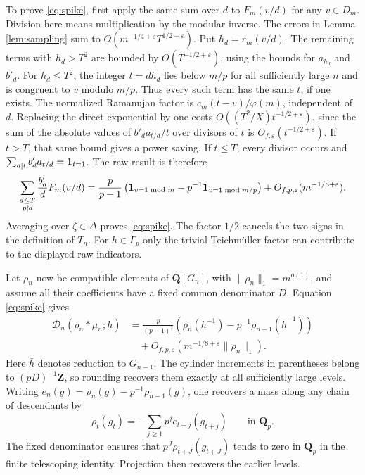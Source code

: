 \documentclass[11pt]{article}
\newcommand{\Z}{\mathbf Z}
\newcommand{\Q}{\mathbf Q}
\begin{document}
To prove \eqref{eq:spike}, first apply the same sum over \(d\) to
\(F_m(v/d)\) for any \(v\in D_m\). Division here means multiplication
by the modular inverse. The errors in Lemma \ref{lem:sampling} sum
to \(O(m^{-1/4+\varepsilon}T^{1/2+\varepsilon})\). Put
\(h_d=r_m(v/d)\). The remaining terms with \(h_d>T^2\) are bounded
by \(O(T^{-1/2+\varepsilon})\), using the bounds for \(a_{h_d}\)
and \(b'_d\). For \(h_d\le T^2\), the integer \(t=d h_d\) lies below
\(m/p\) for all sufficiently large \(n\) and is congruent to \(v\) modulo
\(m/p\). Thus every such term has the same \(t\), if one exists.
The normalized Ramanujan factor is \(c_m(t-v)/\varphi(m)\),
independent of \(d\). Replacing the direct exponential by one costs
\(O((T^2/X)t^{-1/2+\varepsilon})\), since the sum of the absolute
values of \(b'_d a_{t/d}/t\) over divisors of \(t\) is
\(O_{f,\varepsilon}(t^{-1/2+\varepsilon})\).
If \(t>T\), that same bound gives a power saving.
If \(t\le T\), every divisor occurs and
\(\sum_{d\mid t}b'_d a_{t/d}={\bf1}_{t=1}\).
The raw result is therefore
\[
 \sum_{\substack{d\le T\\p\nmid d}}\frac{b'_d}{d}F_m(v/d)
 =
 \frac{p}{p-1}\left(
    {\bf1}_{v=1\bmod m}-p^{-1}{\bf1}_{v=1\bmod m/p}\right)
   + O_{f,p,\varepsilon}(m^{-1/8+\varepsilon}).
\]
Averaging over \(\zeta\in\Delta\) proves \eqref{eq:spike}. The factor
\(1/2\) cancels the two signs in the definition of \(T_n\). For
\(h\in\Gamma_p\) only the trivial Teichm\"uller factor can contribute
to the displayed raw indicators.

Let \(\rho_n\) now be compatible elements of \(\Q[G_n]\), with
\(\|\rho_n\|_1=m^{o(1)}\), and assume all their coefficients have a
fixed common denominator \(D\). Equation \eqref{eq:spike} gives
\begin{align*}
 \mathcal D_n(\rho_n*\mu_n;h)
 &=\frac{p}{(p-1)^2}
     \left(\rho_n(h^{-1})-p^{-1}\rho_{n-1}(\bar h^{-1})\right)\\
 &\quad+O_{f,p,\varepsilon}\left(m^{-1/8+\varepsilon}
                                      \|\rho_n\|_1\right).
\end{align*}
Here \(\bar h\) denotes reduction to \(G_{n-1}\). The cylinder
increments in parentheses belong to \((pD)^{-1}\Z\), so rounding
recovers them exactly at all sufficiently large levels.
Writing \(e_n(g)=\rho_n(g)-p^{-1}\rho_{n-1}(\bar g)\), one recovers
a mass along any chain of descendants by
\[
 \rho_t(g_t)=-\sum_{j\ge1}p^j e_{t+j}(g_{t+j})
       \qquad\text{in }\Q_p .
\]
The fixed denominator ensures that \(p^J\rho_{t+J}(g_{t+J})\)
tends to zero in \(\Q_p\) in the finite telescoping identity.
Projection then recovers the earlier levels.
\end{document}
